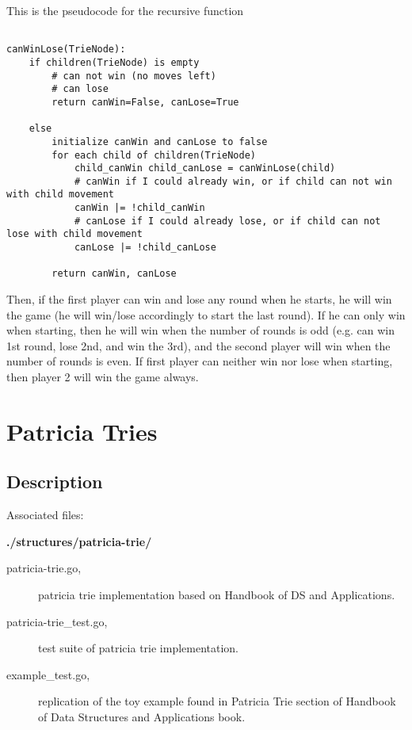 \documentclass[a4paper,10pt,table,xcdraw]{article}
\begin{document}
This is the pseudocode for the recursive function
\begin{verbatim}

canWinLose(TrieNode): 
	if children(TrieNode) is empty
        # can not win (no moves left)
        # can lose 
        return canWin=False, canLose=True
        
    else 
        initialize canWin and canLose to false
        for each child of children(TrieNode)
            child_canWin child_canLose = canWinLose(child)
            # canWin if I could already win, or if child can not win with child movement
            canWin |= !child_canWin 
            # canLose if I could already lose, or if child can not lose with child movement
            canLose |= !child_canLose
	
        return canWin, canLose
\end{verbatim}

Then, if the first player can win and lose any round when he starts, he will win the game (he will win/lose accordingly to start the last round). If he can only win when starting, then he will win when the number of rounds is odd (e.g. can win 1st round, lose 2nd, and win the 3rd), and the second player will win when the number of rounds is even. If first player can neither win nor lose when starting, then player 2 will win the game always.


\section{Patricia Tries}
\label{sec:patricia-tries}

\subsection{Description}

Associated files:

\textbf{./structures/patricia-trie/}
\begin{description}
\item [\hspace{10mm} patricia-trie.go,] patricia trie implementation based on Handbook of DS and Applications.
\item [\hspace{10mm} patricia-trie\_test.go,] test suite of patricia trie implementation.
\item [\hspace{10mm} example\_test.go,] replication of the toy example found in Patricia Trie section of Handbook of Data Structures and Applications book.

\end{description}
\end{document}
